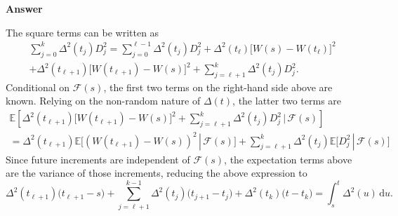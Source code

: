 \documentclass[11pt]{article}
\newcommand\E{\mathbb{E}}
\newcommand\cF{\mathcal{F}}
\newenvironment{hwanswer}
    {
        \vspace{2mm}
        {\bfseries Answer}
        \vspace{-\abovedisplayskip}
        \begin{center}
            \begin{tcolorbox}[
                width=0.95\textwidth,
                colback=white,
                colframe=white,
                opacityback=0,
                opacityframe=0,
                boxrule=0pt,
                frame hidden,
                breakable,
                before upper={\parindent15pt} %
            ]
            \lineskip=0pt %
    }
    {
        \end{tcolorbox}
        \end{center}
        \vspace{4mm}
    }
\begin{document}
\begin{hwanswer}
\begin{enumerate}[(i)]
            The square terms can be written as
            \[
                \begin{multlined}
                    \sum_{j=0}^{k}
                    \Delta^2(t_j) D_{j}^2
                    =
                    \sum_{j=0}^{\ell-1}
                    \Delta^2(t_j) D_{j}^2
                    +
                    \Delta^2(t_{\ell}) \big[ W(s) - W(t_{\ell}) \big]^2
                    \\
                    +
                    \Delta^2(t_{\ell+1}) \big[ W(t_{\ell+1}) - W(s) \big]^2
                    +
                    \sum_{j=\ell+1}^{k}
                    \Delta^2(t_j) D_{j}^2.
                \end{multlined}
            \]
            Conditional on $\cF(s)$, the first two terms on the right-hand side above are
            known. Relying on the non-random nature of $\Delta(t)$, the latter two terms
            are
            \[
                \begin{multlined}
                    \E\left[
                        \Delta^2(t_{\ell+1}) \big[ W(t_{\ell+1}) - W(s) \big]^2
                        +
                        \sum_{j=\ell+1}^{k}
                        \Delta^2(t_j) D_{j}^2
                        \, \bigg| \,
                        \cF(s)
                    \right]
                    \\
                    =
                    \Delta^2(t_{\ell+1})
                    \E\big[
                        (W(t_{\ell+1}) - W(s))^2
                        \, | \,
                        \cF(s)
                    \big]
                    +
                    \sum_{j=\ell+1}^{k}
                    \Delta^2(t_j)
                    \E\big[
                        D_{j}^2
                        \, | \,
                        \cF(s)
                    \big]
                \end{multlined}
            \]
            Since future increments are independent of $\cF(s)$, the expectation terms above
            are the variance of those increments, reducing the above expression to
            \[
                \Delta^2(t_{\ell+1})
                \big( t_{\ell+1} - s \big)
                +
                \sum_{j=\ell+1}^{k-1}
                \Delta^2(t_j)
                \big( t_{j+1} - t_{j} \big)
                +
                \Delta^2(t_k)
                \big( t - t_{k} \big)
                =
                \int_{s}^{t}
                \Delta^2(u) \, \text{d} u.
            \]


\end{enumerate}
\end{hwanswer}
\end{document}
